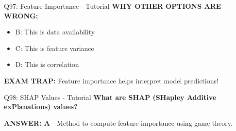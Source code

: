 \documentclass[8pt]{beamer}
\begin{document}
\begin{frame}{Q97: Feature Importance - Tutorial}
		\vspace{0.05cm}
		\textcolor{myred}{\textbf{WHY OTHER OPTIONS ARE WRONG:}}
		\begin{itemize}
			\item \textcolor{myred}{B:} This is data availability
			\item \textcolor{myred}{C:} This is feature variance
			\item \textcolor{myred}{D:} This is correlation
		\end{itemize}
		
		\textcolor{myred}{\textbf{EXAM TRAP:}} Feature importance helps interpret model predictions!
	\end{frame}
	
	\begin{frame}{Q98: SHAP Values - Tutorial}
		\fontsize{6.5}{7.5}\selectfont
		\textbf{What are SHAP (SHapley Additive exPlanations) values?}
		
		\vspace{0.05cm}
		\textcolor{myblue}{\textbf{ANSWER: A}} - Method to compute feature importance using game theory.
		

\end{frame}
\end{document}
